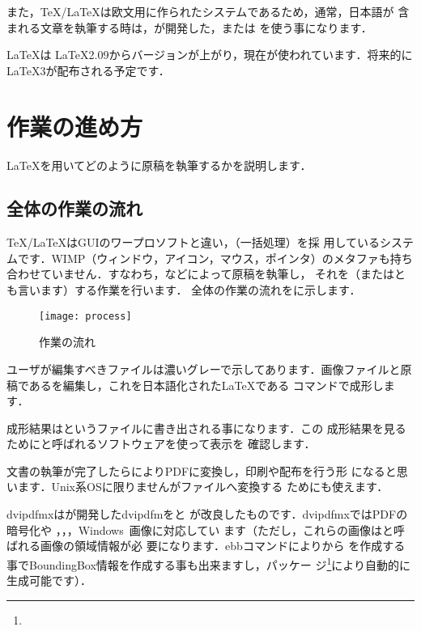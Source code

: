 また，\TeX/\LaTeX は欧文用に作られたシステムであるため，通常，日本語が
含まれる文章を執筆する時は，が開発した\pTeX ，または\pLaTeX
を使う事になります．

\LaTeX は \LaTeX\;2.09からバージョンが上がり，現在が使われています．将来的に\LaTeX\;3が配布される予定です．

\section{作業の進め方}
\LaTeX を用いてどのように原稿を執筆するかを説明します．

\subsection{全体の作業の流れ}
\TeX/\LaTeX はGUIのワープロソフトと違い，（一括処理）を採
用しているシステムです．WIMP（ウィンドウ，アイコン，マウス，ポインタ）のメタファも持ち
合わせていません．すなわち，などによって原稿を執筆し，
それを（またはとも言います）する作業を行います．
全体の作業の流れをに示します．

\begin{figure}[htbp]
 \centering
 \texttt{[image: process]}
 \caption{作業の流れ}
\end{figure}

%
%
%
%
%
%
ユーザが編集すべきファイルは濃いグレーで示してあります．画像ファイルと原
稿であるを編集し，これを日本語化された\LaTeX である
コマンドで成形します．

成形結果はというファイルに書き出される事になります．この
成形結果を見るためにと呼ばれるソフトウェアを使って表示を
確認します．

%
%
文書の執筆が完了したらによりPDFに変換し，印刷や配布を行う形
になると思います．Unix系OSに限りませんがファイルへ変換する
ためにも使えます．

dvipdfmxはが開発したdvipdfmをと
が改良したものです．dvipdfmxではPDFの暗号化や
，，，Windows~画像に対応してい
ます（ただし，これらの画像はと呼ばれる画像の領域情報が必
要になります．ebbコマンドによりから
を作成する事でBoundingBox情報を作成する事も出来ますし，パッケー
ジ\footnote{\webMediaBB}により自動的に生成可能です）．

